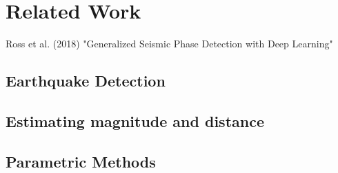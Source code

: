 \documentclass[thesis.tex]{subfiles}
\begin{document}
%
\chapter{Related Work}\label{chap:prevwork}
Ross et al. (2018) "Generalized Seismic Phase Detection with Deep Learning"\cite{ross2018generalized}

%
%
\section{Earthquake Detection}
%
%
\section{Estimating magnitude and distance}

\section{Parametric Methods}

\subfilebib %
\end{document}
